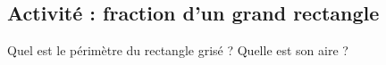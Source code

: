 
\subsection*{Activité : fraction d'un grand rectangle}

Quel est le périmètre du rectangle grisé ? Quelle est son aire ?
\begin{center}
   
\end{center}
